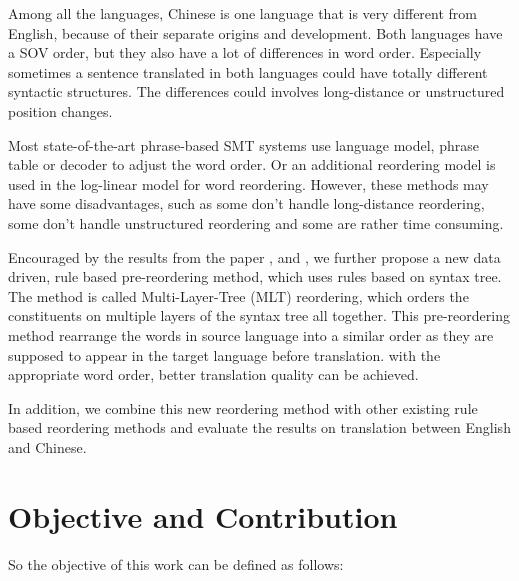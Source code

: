 Among all the languages, Chinese is one language that is very different from English, because of their separate origins and development. Both languages have a SOV order, but they also have a lot of differences in word order. Especially sometimes a sentence translated in both languages could have totally different syntactic structures. The differences could involves long-distance or unstructured position changes.

Most state-of-the-art phrase-based SMT systems use language model, phrase table or decoder to adjust the word order. Or an additional reordering model is used in the log-linear model for word reordering. However, these methods may have some disadvantages, such as some don't handle long-distance reordering, some don't handle unstructured reordering and some are rather time consuming.

Encouraged by the results from the paper \cite{short}, \cite{long} and \cite{tree}, we further propose a new data driven, rule based pre-reordering method, which uses rules based on syntax tree. The method is called Multi-Layer-Tree (MLT) reordering, which orders the constituents on multiple layers of the syntax tree all together. This pre-reordering method rearrange the words in source language into a similar order as they are supposed to appear in the target language before translation. with the appropriate word order, better translation quality can be achieved.

In addition, we combine this new reordering method with other existing rule based reordering methods and evaluate the results on translation between English and Chinese. %


\section{Objective and Contribution}
\label{ch:Introduction:sec:ObjectiveAndContribution}

So the objective of this work can be defined as follows:

\begin{center}
\end{center}


